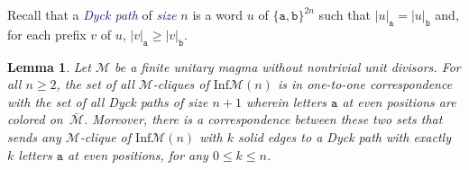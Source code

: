 \documentclass[10pt,reqno]{amsart}
\numberwithin{equation}{subsection}
\renewcommand{\leq}{\leqslant}
\renewcommand{\geq}{\geqslant}
\newtheorem{Lemma}[Theorem]{Lemma}
\newcommand{\Mca}{\mathcal{M}}
\newcommand{\Att}{\mathtt{a}}
\newcommand{\Btt}{\mathtt{b}}
\newcommand{\Inf}{\mathrm{Inf}}
\newcommand{\Def}[1]{\textcolor{MidnightBlue}{\em #1}}
\begin{document}
Recall that a \Def{Dyck path} of \Def{size} $n$ is a word $u$ of
$\{\Att, \Btt\}^{2n}$ such that $|u|_\Att = |u|_\Btt$ and, for each
prefix $v$ of $u$, $|v|_\Att \geq |v|_\Btt$.
\medskip

\begin{Lemma} \label{lem:bijection_Inf_M_Dyck_paths}
    Let $\Mca$ be a finite unitary magma without nontrivial unit
    divisors. For all $n \geq 2$, the set of all $\Mca$-cliques of
    $\Inf\Mca(n)$ is in one-to-one correspondence with the set of all
    Dyck paths of size $n + 1$ wherein letters $\Att$ at even positions
    are colored on~$\bar{\Mca}$. Moreover, there is a correspondence
    between these two sets that sends any $\Mca$-clique of $\Inf\Mca(n)$
    with $k$ solid edges to a Dyck path with exactly $k$ letters $\Att$
    at even positions, for any $0 \leq k \leq n$.
\end{Lemma}
\end{document}
